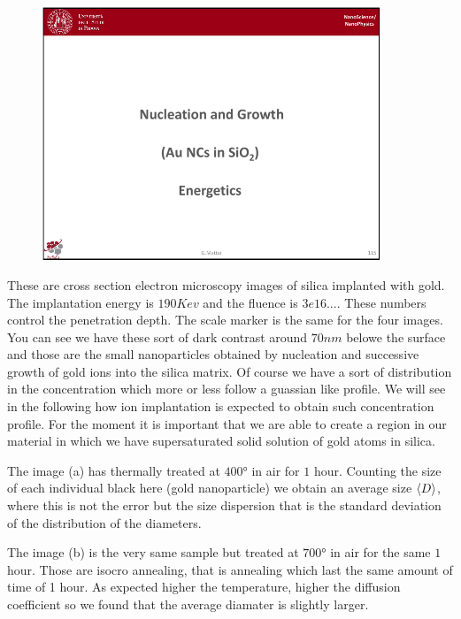 \documentclass[../main/main.tex]{subfiles}
\begin{document}
\begin{figure}[h!]
\centering
\includegraphics[page=2,width=0.9\textwidth]{../lessons/pdf_file/8_lesson.pdf}
\end{figure}

These are cross section electron microscopy images of silica implanted with gold. The implantation energy is \( 190Kev \) and the fluence is \( 3e16 ...\). These numbers control the penetration depth.  The scale marker is the same for the four images. You can see we have these sort of dark contrast around \( 70nm \) belowe the surface and those are the small nanoparticles obtained by nucleation and successive growth of gold ions into the silica matrix. Of course we have a sort of distribution in the concentration which more or less follow a guassian like profile. We will see in the following how ion implantation is expected to obtain such concentration profile. For the moment it is important that we are able to create a region in our material in which we have supersaturated solid solution of gold atoms in silica.

The image (a) has thermally treated at \( 400° \) in air for \( 1 \) hour. Counting the size of each individual black here (gold nanoparticle) we obtain an average size \( \expval{D}  \), where this is not the error but the size dispersion that is the standard deviation of the distribution of the diameters.

The image (b) is the very same sample but treated at \( 700° \) in air for the same \( 1 \) hour. Those are isocro annealing, that is annealing which last the same amount of time of 1 hour. As expected higher the temperature, higher the diffusion coefficient so we found that the average diamater is slightly larger.
\end{document}
